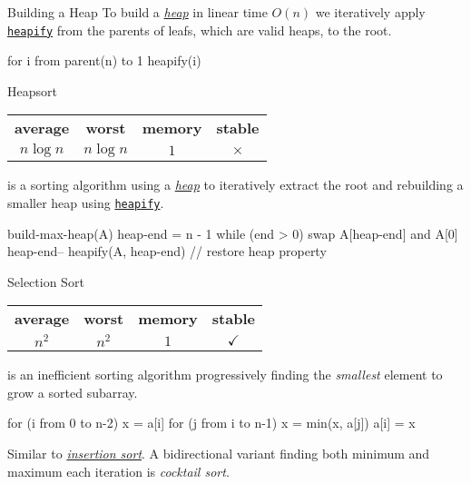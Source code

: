 \documentclass{cognito}
\begin{document}
\begin{note}{Building a Heap} %
	To build a \hyperref[note:Heap]{\it heap} in linear time $O(n)$ we iteratively apply \hyperref[note:Heapify]{\tt heapify}
	from the parents of leafs, which are valid heaps, to the root.
		\begin{largecode}
 for i from parent(n) to 1
 	heapify(i)
	\end{largecode}	
	\vspace{-5pt}
\end{note}


\begin{note}{Heapsort}
	\begin{mdframed}[linecolor=black!25!white]%
	\begin{tabular}{@{} c | c | c | c  @{}}
		\bf average & \bf worst & \bf memory & \bf stable \\
		$n \log n$ & $n \log n$ & $1$ & $\times$
	\end{tabular}%
	\end{mdframed}
	 is a sorting algorithm using a \hyperref[note:Heap]{\it heap}
	to iteratively extract the root and rebuilding a smaller heap using \hyperref[note:Heapify]{\tt heapify}.
	\begin{largecode}
 build-max-heap(A)
 heap-end = n - 1
 while (end > 0) {
 	swap A[heap-end] and A[0]
	heap-end--
	heapify(A, heap-end)  // restore heap property
 }
	\end{largecode}	
	\vspace{-5pt}
\end{note}

\begin{note}{Selection Sort}
	\begin{mdframed}[linecolor=black!25!white]%
	\begin{tabular}{@{} c | c | c | c  @{}}
		\bf average & \bf worst & \bf memory & \bf stable \\
		$n^2$ & $n^2$ & $1$ & $\checkmark$
	\end{tabular}%
	\end{mdframed}
	 is an inefficient sorting algorithm
	progressively finding the {\it smallest} element to grow a sorted subarray.
	
	\begin{largecode}
 for (i from 0 to n-2)
 	x = a[i]
	for (j from i to n-1) x = min(x, a[j])
	a[i] = x
	\end{largecode}
	\begin{remark} Similar to \hyperref[note:Insertion Sort]{\it insertion sort}.
		A bidirectional variant finding both minimum and maximum each iteration is {\it cocktail sort}.
	\end{remark}\vspace{-5pt}
\end{note}
\end{document}
